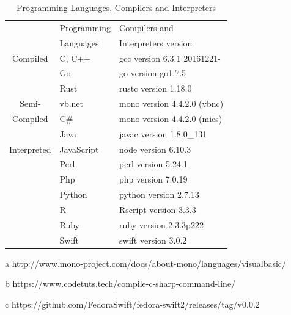 \begin{table}
	\begin{threeparttable}
		\caption{Programming Languages, Compilers and Interpreters}
		\label{Languages_Compilers_and_Interpreters}
		\begin{tabular}{cll}
			\toprule
			& Programming  & Compilers and  \\
			& Languages  &  Interpreters version\\
			\midrule
			Compiled&C, C++	& gcc version 6.3.1 20161221- \\
			&Go		& go version go1.7.5  \\
			&Rust	& rustc version 1.18.0 \\
			\midrule
			Semi-&{\sc vb.net} & mono version 4.4.2.0 (vbnc)\tnote{a} \\
			Compiled&C\#		& mono version 4.4.2.0 (mics)\tnote{b} \\
			&Java	& javac version 1.8.0\_131 \\
			\midrule
			Interpreted&JavaScript & node version 6.10.3 \\
			&Perl	& perl version 5.24.1 \\
			&Php		& php version 7.0.19 \\
			&Python	& python version 2.7.13 \\
			&R		& Rscript version 3.3.3 \\
			&Ruby	& ruby version 2.3.3p222 \\
			
			&Swift 	& swift version 3.0.2\tnote{c} \\
			
			\bottomrule
		\end{tabular}
		\begin{tablenotes}
			\begin{small}
				\item[a] {http://www.mono-project.com/docs/about-mono/languages/visualbasic/}
				\item[b] {https://www.codetuts.tech/compile-c-sharp-command-line/}
				\item[c] {https://github.com/FedoraSwift/fedora-swift2/releases/tag/v0.0.2}
			\end{small}
		\end{tablenotes}
	\end{threeparttable}
\end{table}

